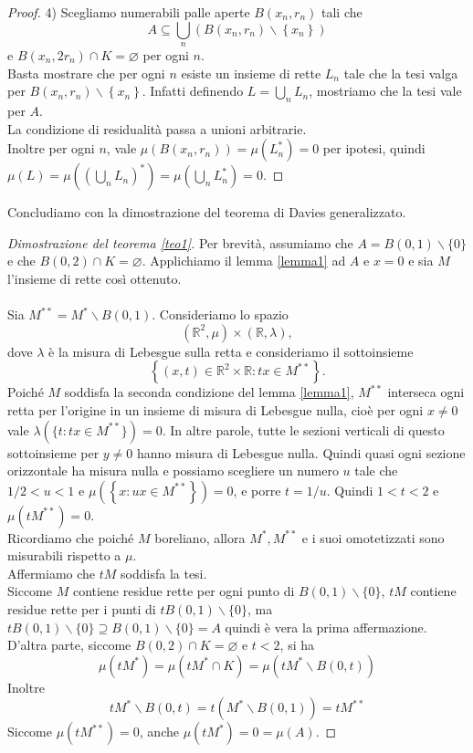 \documentclass[a4paper, twoside]{article}
\newcommand{\<}{\langle}
\renewcommand{\>}{\rangle}
\begin{document}
\begin{proof}
	4) Scegliamo numerabili palle aperte $B\left(x_{n}, r_{n}\right)$ tali che
	$$ A \subseteq \bigcup_{n}\left(B\left(x_{n}, r_{n}\right) \backslash\left\{x_{n}\right\}\right)$$
	e $B\left(x_{n}, 2 r_{n}\right) \cap K=\varnothing$ per ogni $n$.\\
	Basta mostrare che per ogni $n$ esiste un insieme di rette $L_{n}$ tale che la tesi valga per $B\left(x_{n}, r_{n}\right) \backslash\left\{x_{n}\right\}$. Infatti definendo $L=\bigcup_n L_n$, mostriamo che la tesi vale per $A$.\\
	La condizione di residualità passa a unioni arbitrarie.\\
	Inoltre per ogni $n$, vale $\mu(B(x_n,r_n))=\mu(L_n^*)=0$ per ipotesi, quindi $\mu(L)=\mu((\bigcup_nL_n)^*) = \mu(\bigcup_n L_n^*)=0$.
	\end{proof}

Concludiamo con la dimostrazione del teorema di Davies generalizzato.

\begin{proof}[Dimostrazione del teorema \ref{teo1}]
	
Per brevità, assumiamo che $A=B(0,1) \backslash\{0\}$ e che $B(0,2) \cap K=\varnothing$. Applichiamo il lemma \ref{lemma1} ad $A$ e $x=0$ e sia $M$ l'insieme di rette così ottenuto.\\
\hfill \\
Sia $M^{* *}=M^{*} \backslash B(0,1)$. Consideriamo lo spazio
$$
\left(\mathbb{R}^{2}, \mu\right) \times(\mathbb{R}, \lambda),
$$
dove $\lambda$ è la misura di Lebesgue sulla retta e consideriamo il sottoinsieme
$$
\left\{(x, t) \in \mathbb{R}^{2} \times \mathbb{R}: t x \in M^{* *}\right\} .
$$
Poiché $M$ soddisfa la seconda condizione del lemma \ref{lemma1}, $M^{**}$ interseca ogni retta per l'origine in un insieme di misura di Lebesgue nulla, cioè per ogni $x \neq 0$ vale $\lambda(\{t: tx \in M^{**}\})=0$. In altre parole, tutte le sezioni verticali di questo sottoinsieme per $y\neq 0$  hanno misura di Lebesgue nulla. Quindi quasi ogni sezione orizzontale ha misura nulla e possiamo scegliere un numero $u$ tale che $1 / 2<u<1$ e $\mu\left(\left\{x: u x \in M^{* *}\right\}\right)=0$, e porre $t=1 / u$. Quindi $1<t<2$ e $\mu\left(t M^{* *}\right)=0$.\\
Ricordiamo che poiché $M$ boreliano, allora $M^*, M^{**}$ e i suoi omotetizzati sono misurabili rispetto a $\mu$.\\
Affermiamo che $t M$ soddisfa la tesi.\\
Siccome $M$ contiene residue rette per ogni punto di $B(0,1) \backslash\{0\}$, $t M$ contiene residue rette per i punti di $t B(0,1) \backslash\{0\}$, ma $t B(0,1) \backslash\{0\} \supseteq B(0,1) \backslash\{0\}=A$ quindi è vera la prima affermazione.\\
D'altra parte, siccome $B(0,2) \cap K=\varnothing$ e $t<2$, si ha
$$
\mu\left(t M^{*}\right)=\mu\left(t M^{*} \cap K\right)=\mu\left(t M^{*} \backslash B(0, t)\right)
$$
Inoltre
$$
t M^{*} \backslash B(0, t)=t\left(M^{*} \backslash B(0,1)\right)=t M^{* *}
$$
Siccome $\mu\left(t M^{* *}\right)=0$, anche $\mu (tM^*)= 0= \mu(A)$.
\end{proof}
\end{document}
